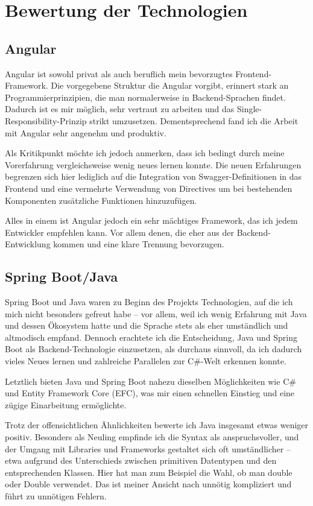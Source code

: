 \chapter{Bewertung der Technologien}
\section{Angular}
Angular ist sowohl privat als auch beruflich mein bevorzugtes Frontend-Framework.
Die vorgegebene Struktur die Angular vorgibt, erinnert stark an Programmierprinzipien, die man normalerweise in Backend-Sprachen findet.
Dadurch ist es mir möglich, sehr vertraut zu arbeiten und das Single-Responsibility-Prinzip strikt umzusetzen.
Dementsprechend fand ich die Arbeit mit Angular sehr angenehm und produktiv.

Als Kritikpunkt möchte ich jedoch anmerken, dass ich bedingt durch meine Vorerfahrung vergleichsweise wenig neues lernen konnte.
Die neuen Erfahrungen begrenzen sich hier lediglich auf die Integration von Swagger-Definitionen in das Frontend und eine vermehrte Verwendung von
Directives um bei bestehenden Komponenten zusätzliche Funktionen hinzuzufügen.

Alles in einem ist Angular jedoch ein sehr mächtiges Framework, das ich jedem Entwickler empfehlen kann.
Vor allem denen, die eher aus der Backend-Entwicklung kommen und eine klare Trennung bevorzugen.

\section{Spring Boot/Java}
Spring Boot und Java waren zu Beginn des Projekts Technologien, auf die ich mich nicht besonders gefreut habe – vor allem, 
weil ich wenig Erfahrung mit Java und dessen Ökosystem hatte und die Sprache stets als eher umständlich und altmodisch empfand. 
Dennoch erachtete ich die Entscheidung, Java und Spring Boot als Backend-Technologie einzusetzen, als durchaus sinnvoll, da ich dadurch vieles Neues lernen und zahlreiche Parallelen zur C\#-Welt erkennen konnte.

Letztlich bieten Java und Spring Boot nahezu dieselben Möglichkeiten wie C\# und Entity Framework Core (EFC), 
was mir einen schnellen Einstieg und eine zügige Einarbeitung ermöglichte. 

Trotz der offensichtlichen Ähnlichkeiten bewerte ich Java insgesamt etwas weniger positiv. Besonders als Neuling empfinde ich die Syntax als anspruchsvoller, 
und der Umgang mit Libraries und Frameworks gestaltet sich oft umständlicher – etwa aufgrund des Unterschieds zwischen 
primitiven Datentypen und den entsprechenden Klassen. Hier hat man zum Beispiel die Wahl, ob man double oder Double verwendet.
Das ist meiner Ansicht nach unnötig kompliziert und führt zu unnötigen Fehlern.

